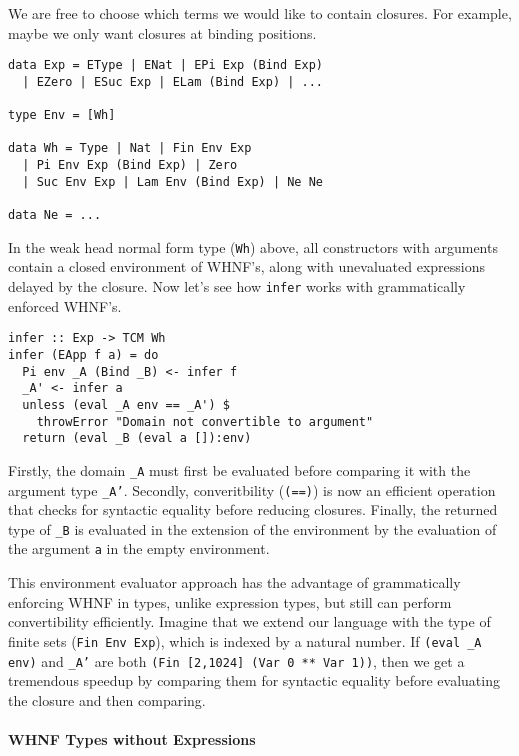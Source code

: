 \documentclass[preprint,authoryear]{sigplanconf}
\begin{document}
We are free to choose which terms we would like to contain closures.
For example, maybe we only want closures at binding positions. 

\begin{verbatim}
data Exp = EType | ENat | EPi Exp (Bind Exp)
  | EZero | ESuc Exp | ELam (Bind Exp) | ...

type Env = [Wh]

data Wh = Type | Nat | Fin Env Exp
  | Pi Env Exp (Bind Exp) | Zero
  | Suc Env Exp | Lam Env (Bind Exp) | Ne Ne

data Ne = ...
\end{verbatim}

In the weak head normal form type (\texttt{Wh}) above, all
constructors with arguments contain a closed environment of WHNF's,
along with unevaluated expressions delayed by the closure. 
Now let's see how \texttt{infer} works with grammatically enforced
WHNF's.

\begin{verbatim}
infer :: Exp -> TCM Wh
infer (EApp f a) = do
  Pi env _A (Bind _B) <- infer f
  _A' <- infer a
  unless (eval _A env == _A') $
    throwError "Domain not convertible to argument"
  return (eval _B (eval a []):env)
\end{verbatim}

Firstly, the domain \texttt{\_A} must first be evaluated before comparing it
with the argument type \texttt{\_A'}. Secondly, converitbility
(\texttt{(==)}) is now an efficient operation that checks for
syntactic equality before reducing closures. Finally, the returned
type of \texttt{\_B} is evaluated in the extension of the environment
by the evaluation of the argument \texttt{a} in the empty environment.

This environment evaluator approach has the advantage of grammatically
enforcing WHNF in types, unlike expression types, but still can
perform convertibility efficiently. Imagine that we extend our
language with the type of finite sets (\texttt{Fin Env Exp}), which is
indexed by a natural number. If \texttt{(eval \_A env)} and \texttt{\_A'}
are both \texttt{(Fin [2,1024] (Var 0 ** Var 1))}, then we get a
tremendous speedup by comparing them for syntactic equality before evaluating
the closure and then comparing.

\paragraph{WHNF Types without Expressions}
\end{document}
